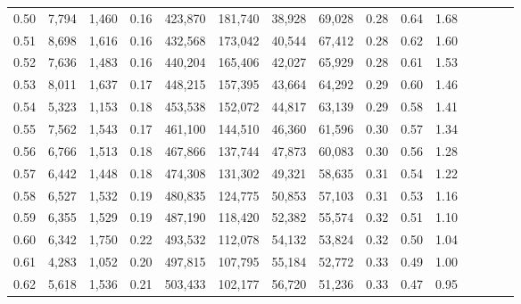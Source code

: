 \begin{tabular}{rrrcrrrrrrrrrrr}
0.50 &   7,794 &  1,460 &                                       0.16 &  423,870 &  181,740 &   38,928 &   69,028 &  0.28 &  0.64 &                         1.68 \\
0.51 &   8,698 &  1,616 &                                       0.16 &  432,568 &  173,042 &   40,544 &   67,412 &  0.28 &  0.62 &                         1.60 \\
0.52 &   7,636 &  1,483 &                                       0.16 &  440,204 &  165,406 &   42,027 &   65,929 &  0.28 &  0.61 &                         1.53 \\
0.53 &   8,011 &  1,637 &                                       0.17 &  448,215 &  157,395 &   43,664 &   64,292 &  0.29 &  0.60 &                         1.46 \\
0.54 &   5,323 &  1,153 &                                       0.18 &  453,538 &  152,072 &   44,817 &   63,139 &  0.29 &  0.58 &                         1.41 \\
0.55 &   7,562 &  1,543 &                                       0.17 &  461,100 &  144,510 &   46,360 &   61,596 &  0.30 &  0.57 &                         1.34 \\
0.56 &   6,766 &  1,513 &                                       0.18 &  467,866 &  137,744 &   47,873 &   60,083 &  0.30 &  0.56 &                         1.28 \\
0.57 &   6,442 &  1,448 &                                       0.18 &  474,308 &  131,302 &   49,321 &   58,635 &  0.31 &  0.54 &                         1.22 \\
0.58 &   6,527 &  1,532 &                                       0.19 &  480,835 &  124,775 &   50,853 &   57,103 &  0.31 &  0.53 &                         1.16 \\
0.59 &   6,355 &  1,529 &                                       0.19 &  487,190 &  118,420 &   52,382 &   55,574 &  0.32 &  0.51 &                         1.10 \\
0.60 &   6,342 &  1,750 &                                       0.22 &  493,532 &  112,078 &   54,132 &   53,824 &  0.32 &  0.50 &                         1.04 \\
0.61 &   4,283 &  1,052 &                                       0.20 &  497,815 &  107,795 &   55,184 &   52,772 &  0.33 &  0.49 &                         1.00 \\
0.62 &   5,618 &  1,536 &                                       0.21 &  503,433 &  102,177 &   56,720 &   51,236 &  0.33 &  0.47 &                         0.95 \\

\end{tabular}

